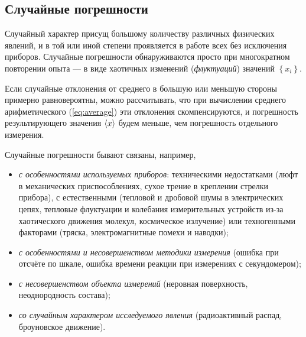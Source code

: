 
\subsection{Случайные погрешности}

Случайный характер присущ большому количеству различных физических
явлений, и в той или иной степени проявляется в работе всех без исключения
приборов. Случайные погрешности обнаруживаются просто при многократном
повторении опыта --- в виде хаотичных изменений (\emph{флуктуаций})
значений $\left\{ x_{i}\right\} $.

Если случайные отклонения от среднего в большую или меньшую стороны
примерно равновероятны, можно рассчитывать, что при вычислении среднего
арифметического (\ref{eq:average}) эти отклонения скомпенсируются,
и погрешность результирующего значения $\left<x\right>$ будем меньше,
чем погрешность отдельного измерения.

Случайные погрешности бывают связаны, например,
\begin{itemize}
    \item \emph{с особенностями используемых приборов}: техническими
недостатками
(люфт в механических приспособлениях, сухое трение в креплении стрелки
прибора), с естественными (тепловой и дробовой шумы в электрических
цепях, тепловые флуктуации и колебания измерительных устройств из-за
хаотического движения молекул, космическое излучение) или техногенными
факторами (тряска, электромагнитные помехи и наводки);

    \item \emph{с особенностями и несовершенством методики измерения} (ошибка
при отсчёте по шкале, ошибка времени реакции при измерениях с секундомером);

    \item \emph{с несовершенством объекта измерений} (неровная поверхность,
неоднородность состава);

    \item \emph{со случайным характером исследуемого явления} (радиоактивный
распад, броуновское движение).
\end{itemize}

